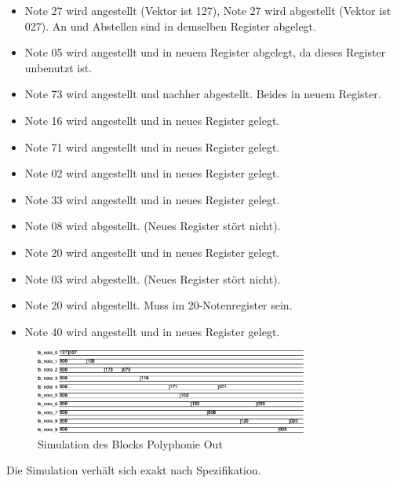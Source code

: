 \begin{itemize}
\item Note 27 wird angestellt (Vektor ist 127), Note 27 wird abgestellt (Vektor ist 027). An und Abstellen sind in demselben Register abgelegt.
\item Note 05 wird angestellt und in neuem Register abgelegt, da dieses Register unbenutzt ist.
\item Note 73 wird angestellt und nachher abgestellt. Beides in neuem Register.
\item Note 16 wird angestellt und in neues Register gelegt.
\item Note 71 wird angestellt und in neues Register gelegt.
\item Note 02 wird angestellt und in neues Register gelegt.
\item Note 33 wird angestellt und in neues Register gelegt.
\item Note 08 wird abgestellt. (Neues Register stört nicht).
\item Note 20 wird angestellt und in neues Register gelegt.
\item Note 03 wird abgestellt. (Neues Register stört nicht).
\item Note 20 wird abgestellt. Muss im 20-Notenregister sein.
\item Note 40 wird angestellt und in neues Register gelegt.
\end{itemize}

\begin{figure}[H]
	\includegraphics[width=0.8\textwidth]{images/midi_interface/tb_polyphonie.png}
	\caption{Simulation des Blocks Polyphonie Out }
	\label{fig.polyphnie_simulation}
\end{figure}

Die Simulation verhält sich exakt nach Spezifikation.
